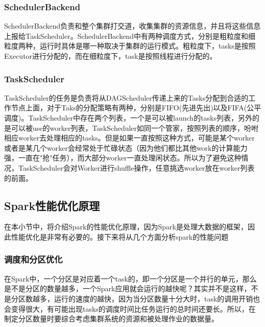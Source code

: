 \subsubsection{SchedulerBackend}
SchedulerBackend负责和整个集群打交道，收集集群的资源信息，并且将这些信息上报给TaskScheduler。SchedulerBackend中有两种调度方式，分别是粗粒度和细粒度两种，运行时具体是哪一种取决于集群的运行模式。粗粒度下，tasks是按照Executor进行分配的，而在细粒度下，task是按照线程进行分配的。
\subsubsection{TaskScheduler}
TaskScheduler的任务是负责将从DAGScheduler传递上来的Tasks分配到合适的工作节点上面，对于Taks的分配策略有两种，分别是FIFO(先进先出)以及FIFA(公平调度)。TaskScheduler中存在两个列表，一个是可以被launch的tasks列表，另外的是可以被use的worker列表，TaskScheduler如同一个管家，按照列表的顺序，吩咐相应worker去处理相应的tasks。但是如果一直按照这种方式，可能是某个worker或者是某几个worker会经常处于忙碌状态（因为他们都比其他work的计算能力强，一直在"抢"任务），而大部分worker一直处理闲状态。所以为了避免这种情况，TaskScheduler会对Worker进行shuffle操作，任意挑选worker放在worker列表的前面。

\subsection{Spark性能优化原理}
在本小节中，将介绍Spark的性能优化原理，因为Spark是处理大数据的框架，因此性能优化是非常有必要的。接下来将从几个方面分析spark的性能问题
\subsubsection{调度和分区优化}
在Spark中，一个分区是对应着一个task的，即一个分区是一个并行的单元，那么是不是分区的数量越多，一个Spark应用就会运行的越快呢？其实并不是这样，不是分区数越多，运行的速度的越快，因为当分区数量十分大时，task的调用开销也会变得很大，有可能出现tasks的调度时间比任务运行的总时间还要长。所以，在制定分区数量时要综合考虑集群系统的资源和被处理作业的数据量。

